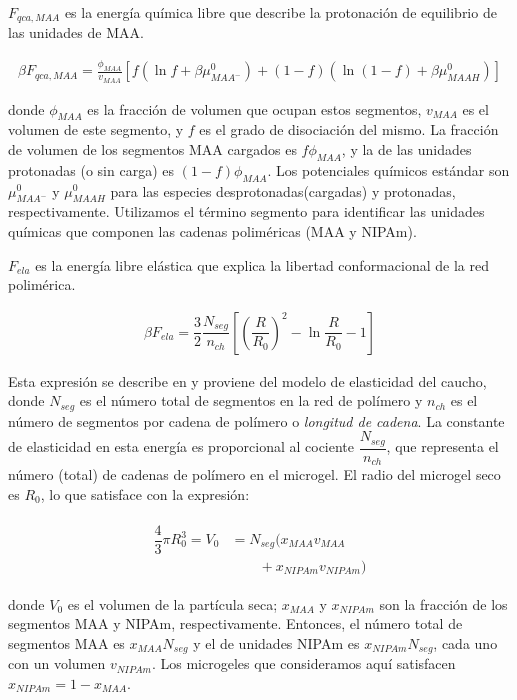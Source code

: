 $F_{qca,MAA}$ es la energ\'ia química libre que describe la protonaci\'on de equilibrio de las unidades de MAA.


\begin{align}
	\beta F_{qca, MAA} =  \frac{\phi_{MAA}}{v_{MAA}} \left[f(\ln f+ \beta\mu^0_{MAA^-}) +(1-f)(\ln (1-f)+\beta\mu^0_{MAAH})\right]
\end{align}


\noindent donde $\phi_{MAA}$ es la fracci\'on de volumen que ocupan estos segmentos, $v_{MAA}$ es el volumen de este segmento, y $f$ es el grado de disociaci\'on del mismo. 
La fracci\'on de volumen de los segmentos MAA cargados es $f\phi_{MAA}$, y la de las unidades protonadas (o sin carga) es $(1-f)\phi_{MAA}$.
Los potenciales qu\'imicos est\'andar son $\mu^0_{MAA^-}$ y $\mu^0_{MAAH}$ para las especies desprotonadas(cargadas) y protonadas, respectivamente.
Utilizamos el t\'ermino segmento para identificar las unidades qu\'imicas que componen las cadenas polim\'ericas (MAA y NIPAm).


$F_{ela}$ es la energ\'ia libre el\'astica que explica la libertad conformacional de la red polim\'erica.

\begin{align}
	\beta F_{ela} = \dfrac{3}{2}\dfrac{N_{seg}}{n_{ch} }\left[\left(\dfrac{R}{R_0}\right)^2 - \ln\dfrac{R}{R_0} -1\right]
\end{align}

Esta expresi\'on se describe en \cite{moncho-jorda2016a} y proviene del modelo de elasticidad del caucho,
donde $N_{seg}$ es el n\'umero total de segmentos en la red de pol\'imero y $n_{ch}$ es el n\'umero de segmentos por cadena de pol\'imero o \emph{longitud de cadena}.
La constante de elasticidad en esta energ\'ia es proporcional al cociente $\dfrac{N_{seg}}{n_{ch}}$, que representa el n\'umero (total) de cadenas de pol\'imero en el microgel.
El radio del microgel seco es $R_0$, lo que satisface con la expresi\'on:

%
%
\begin{align}
	\begin{aligned} 
		\dfrac{4}{3}\pi R_0^3=V_0&=N_{seg}\Big( x_{MAA} v_{MAA}\\
		&\qquad+x_{NIPAm} v_{NIPAm}\Big)
	\end{aligned}
\end{align}


\noindent donde $V_0$ es el volumen de la part\'icula seca; $x_{MAA}$ y $x_{NIPAm}$ son la fracci\'on de los segmentos MAA y NIPAm, respectivamente.
Entonces, el n\'umero total de segmentos MAA es $x_{MAA}N_{seg}$ y el de unidades NIPAm es $x_{NIPAm}N_{seg}$, cada uno con un volumen $v_{NIPAm}$.
Los microgeles que consideramos aqu\'i satisfacen $x_{NIPAm}=1-x_{MAA}$.



